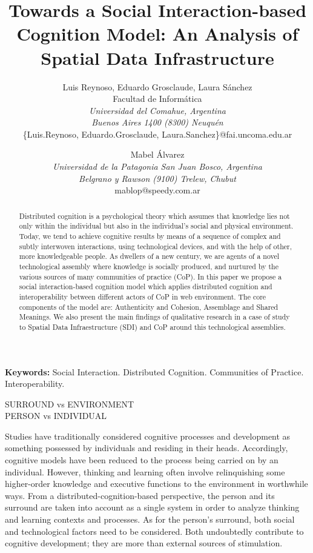 \documentclass[10pt,twocolumn,ieeetran]{article}
\title{Towards a Social Interaction-based Cognition Model: An Analysis of Spatial Data Infrastructure}
\author{Luis Reynoso, Eduardo Grosclaude, Laura S\' anchez \\
Facultad de Inform\' atica\\ {\it Universidad del Comahue, Argentina} \\
{\it Buenos Aires 1400 (8300) Neuqu\'en}\\ \{Luis.Reynoso, Eduardo.Grosclaude,  Laura.Sanchez\}@fai.uncoma.edu.ar\\
\and
Mabel \' Alvarez\\
{\it Universidad de la Patagonia San Juan Bosco, Argentina}\\
{\it Belgrano y Rawson (9100) Trelew, Chubut}\\
mablop@speedy.com.ar\\
}
\begin{document}
\maketitle
\thispagestyle{empty}




\begin{abstract}
Distributed cognition is a psychological theory which assumes that knowledge lies not only within the individual but also in the individual's social and physical environment. Today, we tend to achieve cognitive results by means of a sequence of complex and subtly interwoven interactions, using  technological devices, and with the help of other, more knowledgeable people. As dwellers of a new century, we are agents of a novel technological assembly where knowledge is socially produced, and nurtured by the various sources of many communities of practice (CoP). In this paper we propose a social interaction-based cognition model which applies distributed cognition and interoperability between different actors of CoP in web environment. The core components of the model are: Authenticity and Cohesion, Assemblage and Shared Meanings. We also present the main findings of qualitative research in a case of study to Spatial Data Infraestructure (SDI) and CoP around this technological assemblies. 

\end{abstract}

{\bf Keywords:} Social Interaction. Distributed Cognition. Communities of Practice. Interoperability. 



SURROUND vs ENVIRONMENT\\
PERSON vs INDIVIDUAL

Studies have traditionally considered cognitive processes \cite {Wang2005} and development as something possessed by individuals and residing in their heads. Accordingly, cognitive models have been reduced to the process being carried on by an individual.  
However, thinking and learning often involve relinquishing some higher-order knowledge and executive functions to the environment in worthwhile ways. 
From a distributed-cognition-based perspective, 
the person and its surround are taken into account as a single system 
in order to analyze  thinking and learning contexts and processes. 
As for the person's surround, both social and technological factors need to be considered. Both undoubtedly contribute to cognitive development; they are more than external sources of stimulation.
\end{document}
